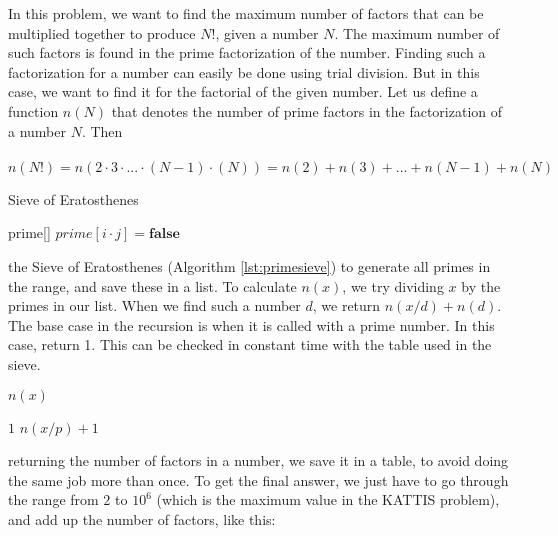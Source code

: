 \documentclass[11pt,a4paper,twoside]{article}
\begin{document}
In this problem, we want to find the maximum number of factors that can be
multiplied together to produce $N!$, given a number $N$.  The maximum number of
such factors is found in the prime factorization of the number. Finding such a
factorization for a number can easily be done using trial division. But in this
case, we want to find it for the factorial of the given number.  Let us define
a function $n(N)$ that denotes the number of prime factors in the factorization
of a number $N$. Then
\\\\
$n(N!) = n(2 \cdot 3 \cdot ... \cdot (N-1) \cdot (N)) = n(2) + n(3) + ... + n(N-1) + n(N)$
\\
\begin{algorithm}
    \caption{Sieve of Eratosthenes}
    \label{lst:primesieve}
    \begin{algorithmic}
        \STATE prime[] 
                    \STATE $prime[i \cdot j] = \textbf{false}$
                \ENDFOR
            \ENDIF
        \ENDFOR
    \end{algorithmic}
\end{algorithm}
            
 the Sieve of Eratosthenes (Algorithm \ref{lst:primesieve}) to
generate all primes in the range, and save these in a list. To calculate
$n(x)$, we try dividing $x$ by the primes in our list. When we find such a
number $d$, we return $n(x/d) + n(d)$. The base case in the recursion is when
it is called with a prime number. In this case, return 1.  This can be checked
in constant time with the table used in the sieve.


\begin{algorithm}
    \caption{$n(x)$}
    \label{lst:nx}
    \begin{algorithmic}
            \RETURN $1$
        \ENDIF
                \RETURN $n(x/p) + 1$
            \ENDIF
        \ENDFOR
    \end{algorithmic}
\end{algorithm}
    
 returning the number of factors in a number, we save it in a
table, to avoid doing the same job more than once. To get the final answer, we
just have to go through the range from $2$ to $10^6$
(which is the maximum value in the KATTIS problem), and add up the number of
factors, like this:
\end{document}
